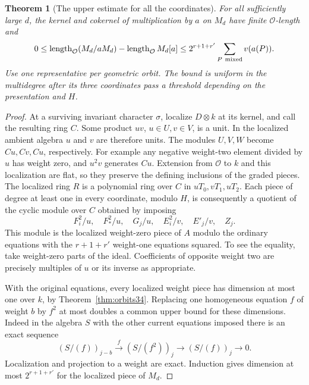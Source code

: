 \documentclass[a4paper,11pt]{article}
\newtheorem{theorem}[proposition]{Theorem}
\theoremstyle{definition}
\theoremstyle{remark}
\newcommand{\len}{\operatorname{length}}\newcommand{\Res}{\operatorname*{Res}}
\numberwithin{equation}{section}
\newcommand{\OO}{\mathcal O}
\begin{document}
\begin{theorem}[The upper estimate for all the coordinates]\leavevmode\label{thm:upper35}
For all sufficiently large \(d\), the kernel and cokernel of multiplication by \(a\) on \(M_d\) have finite \(\OO\)-length and
\begin{equation}
 0\le \len_{\OO}(M_d/aM_d)-\len_{\OO}M_d[a]
       \le 2^{r+1+r'}\sum_{P\ {\rm mixed}}v(a(P)).              \label{eq:upper35}
\end{equation}
Use one representative per geometric orbit. The bound is uniform in the multidegree after its three coordinates pass a threshold depending on the presentation and \(H\).
\end{theorem}
\begin{proof}
At a surviving invariant character \(\sigma\), localize \(D\otimes k\) at its kernel, and call the resulting ring \(C\). Some product \(uv\), \(u\in U,v\in V\), is a unit. In the localized ambient algebra \(u\) and \(v\) are therefore units. The modules \(U,V,W\) become \(Cu,Cv,Cu\), respectively. For example any negative weight-two element divided by \(u\) has weight zero, and \(u^2v\) generates \(Cu\). Extension from \(\OO\) to \(k\) and this localization are flat, so they preserve the defining inclusions of the graded pieces. The localized ring \(R\) is a polynomial ring over \(C\) in \(uT_0,vT_1,uT_2\). Each piece of degree at least one in every coordinate, modulo \(H\), is consequently a quotient of the cyclic module over \(C\) obtained by imposing
\[
 F_i^2/u,\quad F_*^2/u,\quad G_j/u,\quad E_i^2/v,\quad E'_j/v,\quad Z_j .
\]
This module is the localized weight-zero piece of \(A\) modulo the ordinary equations with the \(r+1+r'\) weight-one equations squared. To see the equality, take weight-zero parts of the ideal. Coefficients of opposite weight two are precisely multiples of \(u\) or its inverse as appropriate.

With the original equations, every localized weight piece has dimension at most one over \(k\), by Theorem~\ref{thm:orbits34}. Replacing one homogeneous equation \(f\) of weight \(b\) by \(f^2\) at most doubles a common upper bound for these dimensions. Indeed in the algebra \(S\) with the other current equations imposed there is an exact sequence
\[
 (S/(f))_{j-b}\xrightarrow{\ f\ }(S/(f^2))_j
                         \longrightarrow (S/(f))_j\longrightarrow0 .
\]
Localization and projection to a weight are exact. Induction gives dimension at most \(2^{r+1+r'}\) for the localized piece of \(M_d\).


\end{proof}
\end{document}
